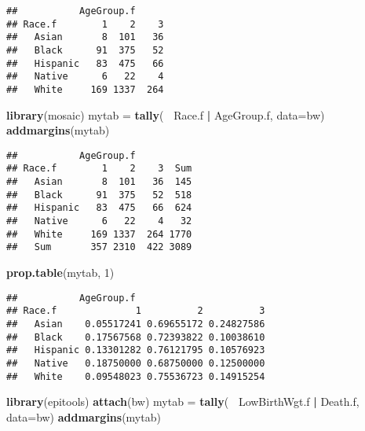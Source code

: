 \documentclass[]{article}
\newenvironment{Shaded}{\begin{snugshade}}{\end{snugshade}}
\newcommand{\KeywordTok}[1]{\textcolor[rgb]{0.13,0.29,0.53}{\textbf{#1}}}
\newcommand{\DataTypeTok}[1]{\textcolor[rgb]{0.13,0.29,0.53}{#1}}
\newcommand{\DecValTok}[1]{\textcolor[rgb]{0.00,0.00,0.81}{#1}}
\newcommand{\StringTok}[1]{\textcolor[rgb]{0.31,0.60,0.02}{#1}}
\newcommand{\OperatorTok}[1]{\textcolor[rgb]{0.81,0.36,0.00}{\textbf{#1}}}
\newcommand{\NormalTok}[1]{#1}
\begin{document}
\begin{verbatim}
##           AgeGroup.f
## Race.f        1    2    3
##   Asian       8  101   36
##   Black      91  375   52
##   Hispanic   83  475   66
##   Native      6   22    4
##   White     169 1337  264
\end{verbatim}

\begin{Shaded}
\begin{Highlighting}[]
\KeywordTok{library}\NormalTok{(mosaic)}
\NormalTok{mytab =}\StringTok{ }\KeywordTok{tally}\NormalTok{(}\OperatorTok{~}\StringTok{ }\NormalTok{Race.f }\OperatorTok{|}\StringTok{ }\NormalTok{AgeGroup.f, }\DataTypeTok{data=}\NormalTok{bw)}
\KeywordTok{addmargins}\NormalTok{(mytab)}
\end{Highlighting}
\end{Shaded}

\begin{verbatim}
##           AgeGroup.f
## Race.f        1    2    3  Sum
##   Asian       8  101   36  145
##   Black      91  375   52  518
##   Hispanic   83  475   66  624
##   Native      6   22    4   32
##   White     169 1337  264 1770
##   Sum       357 2310  422 3089
\end{verbatim}

\begin{Shaded}
\begin{Highlighting}[]
\KeywordTok{prop.table}\NormalTok{(mytab, }\DecValTok{1}\NormalTok{)}
\end{Highlighting}
\end{Shaded}

\begin{verbatim}
##           AgeGroup.f
## Race.f              1          2          3
##   Asian    0.05517241 0.69655172 0.24827586
##   Black    0.17567568 0.72393822 0.10038610
##   Hispanic 0.13301282 0.76121795 0.10576923
##   Native   0.18750000 0.68750000 0.12500000
##   White    0.09548023 0.75536723 0.14915254
\end{verbatim}

\begin{Shaded}
\begin{Highlighting}[]
\KeywordTok{library}\NormalTok{(epitools)}
\KeywordTok{attach}\NormalTok{(bw)}
\NormalTok{mytab =}\StringTok{ }\KeywordTok{tally}\NormalTok{(}\OperatorTok{~}\StringTok{ }\NormalTok{LowBirthWgt.f }\OperatorTok{|}\StringTok{ }\NormalTok{Death.f, }\DataTypeTok{data=}\NormalTok{bw)}
\KeywordTok{addmargins}\NormalTok{(mytab)}
\end{Highlighting}
\end{Shaded}
\end{document}
